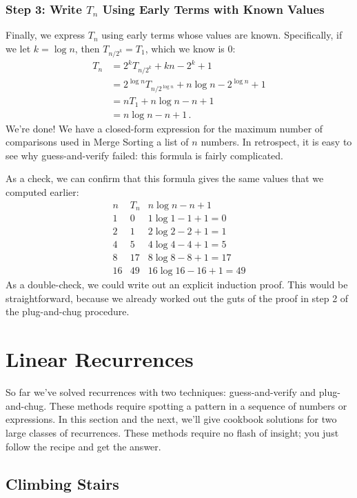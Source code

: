 \subsubsection*{Step 3:  Write $T_n$ Using Early Terms with Known Values}

Finally, we express $T_n$ using early terms whose values are known.
Specifically, if we let $k = \log n$, then $T_{n/2^k} = T_1$, which we
know is 0:
\begin{align*}
T_n & = 2^k T_{n/2^k} + kn - 2^k + 1 \\
  & = 2^{\log n} T_{n/2^{\log n}} + n \log n - 2^{\log n} + 1 \\
  & = n T_1 + n \log n - n + 1 \\
  & = n \log n - n + 1\, .
\end{align*}
We're done!  We have a closed-form expression for the maximum number
of comparisons used in Merge Sorting a list of $n$ numbers.  In
retrospect, it is easy to see why guess-and-verify failed:  this
formula is fairly complicated.

As a check, we can confirm that this formula gives the same values
that we computed earlier:
\[
\begin{array}{c|c|c}
n & T_n & n \log n - n + 1 \\ \hline
1 & 0 & 1 \log 1 - 1 + 1 = 0 \\
2 & 1 & 2 \log 2 - 2 + 1 = 1 \\
4 & 5 & 4 \log 4 - 4 + 1 = 5 \\
8 & 17 & 8 \log 8 - 8 + 1 = 17 \\
16 & 49 & 16 \log 16 - 16 + 1 = 49
\end{array}
\]
As a double-check, we could write out an explicit induction proof.
This would be straightforward, because we already worked out the guts
of the proof in step 2 of the plug-and-chug procedure.

\section{Linear Recurrences}

So far we've solved recurrences with two techniques: guess-and-verify
and plug-and-chug.  These methods require spotting a pattern in a
sequence of numbers or expressions.  In this section and the next,
we'll give cookbook solutions for two large classes of recurrences.
These methods require no flash of insight; you just follow the recipe
and get the answer.

\subsection{Climbing Stairs}

